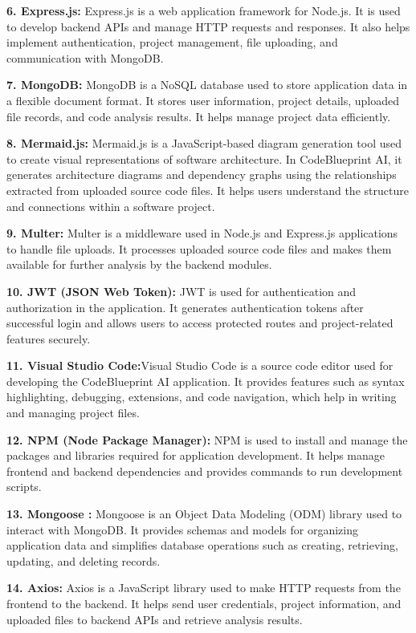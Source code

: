 \documentclass[0pt, a4 paper]{report}
\begin{document}
\begin{center}
{\justify \textbf{6. Express.js:} Express.js is a web application framework for Node.js. It is used to develop backend APIs and manage HTTP requests and responses. It also helps implement authentication, project management, file uploading, and communication with MongoDB.

\justify \textbf{7. MongoDB:} MongoDB is a NoSQL database used to store application data in a flexible document format. It stores user information, project details, uploaded file records, and code analysis results. It helps manage project data efficiently.

\justify \textbf{8. Mermaid.js:} Mermaid.js is a JavaScript-based diagram generation tool used to create visual representations of software architecture. In CodeBlueprint AI, it generates architecture diagrams and dependency graphs using the relationships extracted from uploaded source code files. It helps users understand the structure and connections within a software project.

\justify \textbf{9. Multer:} Multer is a middleware used in Node.js and Express.js applications to handle file uploads. It processes uploaded source code files and makes them available for further analysis by the backend modules.

\justify \textbf{10. JWT (JSON Web Token):} JWT is used for authentication and authorization in the application. It generates authentication tokens after successful login and allows users to access protected routes and project-related features securely.

\justify \textbf{11. Visual Studio Code:}Visual Studio Code is a source code editor used for developing the CodeBlueprint AI application. It provides features such as syntax highlighting, debugging, extensions, and code navigation, which help in writing and managing project files.

\justify \textbf{12. NPM (Node Package Manager):} NPM is used to install and manage the packages and libraries required for application development. It helps manage frontend and backend dependencies and provides commands to run development scripts.

\justify \textbf{13. Mongoose :} Mongoose is an Object Data Modeling (ODM) library used to interact with MongoDB. It provides schemas and models for organizing application data and simplifies database operations such as creating, retrieving, updating, and deleting records.

\justify \textbf{14. Axios:} Axios is a JavaScript library used to make HTTP requests from the frontend to the backend. It helps send user credentials, project information, and uploaded files to backend APIs and retrieve analysis results.

}
\end{center}
\end{document}
